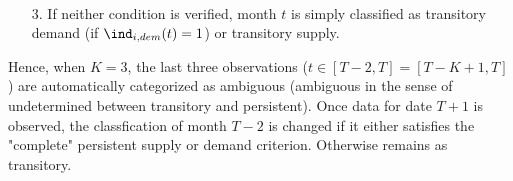 \begin{itemize}
\begin{align*}
    \end{align*}
    \item[3.] If neither condition is verified, month $t$ is simply classified as transitory demand (if $\ind_{i,dem}(t)=1$) or transitory supply.
\end{itemize}

Hence, when $K=3$, the last three observations ($t\in[T-2,T]=[T-K+1,T]$) are automatically categorized as ambiguous (ambiguous in the sense of undetermined between transitory and persistent). 
Once data for date $T+1$ is observed, the classfication of month $T-2$ is changed if it either satisfies the "complete" persistent supply or demand criterion. Otherwise remains as transitory.


\clearpage